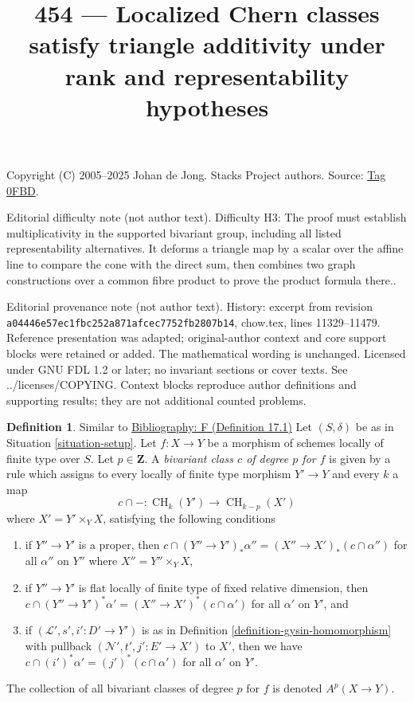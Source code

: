 \documentclass{amsart}
\newenvironment{reference}{\comment}{\endcomment}
\theoremstyle{plain}
\theoremstyle{definition}
\newtheorem{definition}[subsection]{Definition}
\theoremstyle{remark}
\numberwithin{equation}{subsection}
\def\CH{\mathop{\mathrm{CH}}\nolimits}
\begin{document}
\title[Stacks Project, Tag 0FBD]{454 --- Localized Chern classes satisfy triangle additivity under rank and representability hypotheses}
\maketitle
\noindent Copyright (C) 2005--2025 Johan de Jong. Stacks Project authors. Source: \href{https://stacks.math.columbia.edu/tag/0FBD}{Tag 0FBD}.

\noindent Editorial difficulty note (not author text). Difficulty H3: The proof must establish multiplicativity in the supported bivariant group, including all listed representability alternatives. It deforms a triangle map by a scalar over the affine line to compare the cone with the direct sum, then combines two graph constructions over a common fibre product to prove the product formula there..

\noindent Editorial provenance note (not author text). History: excerpt from revision \texttt{a0444\allowbreak 6e57e\allowbreak c1fbc\allowbreak 252a8\allowbreak 71afc\allowbreak ec775\allowbreak 2fb28\allowbreak 07b14}, chow.tex, lines 11329--11479. Reference presentation was adapted; original-author context and core support blocks were retained or added. The mathematical wording is unchanged. Licensed under GNU FDL 1.2 or later; no invariant sections or cover texts. See ../licenses/COPYING. Context blocks reproduce author definitions and supporting results; they are not additional counted problems.

\begin{definition}
\label{definition-bivariant-class}
\begin{reference}
Similar to \href{https://stacks.math.columbia.edu/bibliography}{Bibliography: F (Definition 17.1)}
\end{reference}
Let $(S, \delta)$ be as in Situation \ref{situation-setup}.
Let $f : X \to Y$ be a morphism of schemes locally of finite type over $S$.
Let $p \in \mathbf{Z}$.
A {\it bivariant class $c$ of degree $p$ for $f$} is given by a rule
which assigns to every locally of finite type morphism $Y' \to Y$
and every $k$ a map
$$
c \cap - : \CH_k(Y') \longrightarrow \CH_{k - p}(X')
$$
where $X' = Y' \times_Y X$, satisfying the following conditions
\begin{enumerate}
\item if $Y'' \to Y'$ is a proper, then
$c \cap (Y'' \to Y')_*\alpha'' = (X'' \to X')_*(c \cap \alpha'')$
for all $\alpha''$ on $Y''$ where $X'' = Y'' \times_Y X$,
\item if $Y'' \to Y'$ is flat locally of finite type of
fixed relative dimension, then
$c \cap (Y'' \to Y')^*\alpha' = (X'' \to X')^*(c \cap \alpha')$
for all $\alpha'$ on $Y'$, and
\item if $(\mathcal{L}', s', i' : D' \to Y')$ is as in
Definition \ref{definition-gysin-homomorphism}
with pullback $(\mathcal{N}', t', j' : E' \to X')$ to $X'$,
then we have $c \cap (i')^*\alpha' = (j')^*(c \cap \alpha')$
for all $\alpha'$ on $Y'$.
\end{enumerate}
The collection of all bivariant classes of degree $p$ for $f$ is
denoted $A^p(X \to Y)$.
\end{definition}
\end{document}
